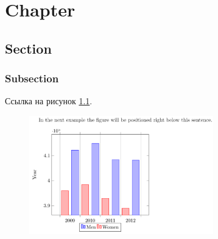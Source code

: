\documentclass[xelatex,big]{G7-32-2017}
\begin{document}
\begin{titlepage}

                
                
                
\end{titlepage}

\frontmatter

\tableofcontents

\Introduction

\lipsum[1-4]

\mainmatter

\chapter{Chapter}

\section{Section}

\subsection{Subsection}

\lipsum

Ссылка на рисунок \ref{ex:fig:1}.
\begin{figure}[h]
    \centering
    \includegraphics[width=8cm]{[NAME]/Plot}
    \caption{\lipsum[6][4-5]}
    \label{ex:fig:1}
\end{figure}
\end{document}
